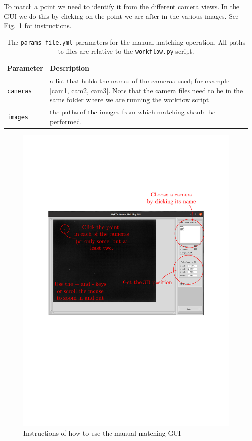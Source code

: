 \documentclass[10pt,a4paper]{article}
\begin{document}
To match a point we need to identify it from the different camera views. In the GUI we do this by clicking on the point we are after in the various images. See Fig.~\ref{fig:man_match} for instructions.

%
\begin{table}[!ht]
	\centering
	\caption{The \texttt{params\_file.yml} parameters for the manual matching operation. All paths to files are relative to the \texttt{workflow.py} script. \label{tab:man_match}}
	\begin{tabular}{l m{12cm}}
		\hline
		Parameter & Description\\[.2cm]
		\hline
		\texttt{cameras} & a list that holds the names of the cameras used; for example [cam1, cam2, cam3]. Note that the camera files need to be in the same folder where we are running the workflow script\\[.2cm]
		\texttt{images} & the paths of the images from which matching should be performed. \\[.2cm]
		\hline
	\end{tabular}
\end{table}



\begin{figure}
	\centering
	\includegraphics[width=12cm]{man_match.pdf}
	\caption{Instructions of how to use the manual matching GUI \label{fig:man_match}}
\end{figure}
\end{document}
